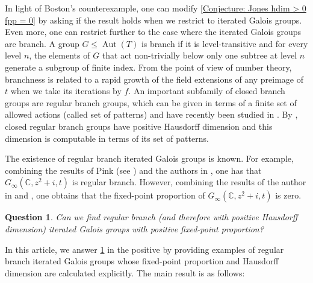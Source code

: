 \documentclass{amsart}
\def\CC{\mathbb C}
\DeclareMathOperator{\Aut}{Aut}
\newtheorem{Question}[Proposition]{Question}
\begin{document}
In light of Boston's counterexample, one can modify \cref{Conjecture: Jones hdim > 0 fpp = 0} by asking if the result holds when we restrict to iterated Galois groups. Even more, one can restrict further to the case where the iterated Galois groups are branch. A group $G \leq \Aut(T)$ is branch if it is level-transitive and for every level $n$, the elements of $G$ that act non-trivially below only one subtree at level $n$ generate a subgroup of finite index. From the point of view of number theory, branchness is related to a rapid growth of the field extensions of any preimage of $t$ when we take its iterations by $f$. An important subfamily of closed branch groups are regular branch groups, which can be given in terms of a finite set of allowed actions (called set of patterns) and have recently been studied in \cite{RadiFiniteType2025}. By \cite[Proposition 2.7]{Bartholdi2006}, closed regular branch groups have positive Hausdorff dimension and this dimension is computable in terms of its set of patterns.

The existence of regular branch iterated Galois groups is known. For example, combining the results of Pink (see \cite[Theorem 6.4.2]{Self_similar_groups}) and the authors in \cite[Theorem 2.5]{GrigSavchukSunic2007}, one has that $G_\infty(\CC, z^2+i,t)$ is regular branch. However, combining the results of the author in \cite[Section 8.3]{RadiFiniteType2025} and \cite[Theorem 1]{FariñaRadi2025}, one obtains that the fixed-point proportion of $G_\infty(\CC,z^2+i,t)$ is zero. 

\begin{Question}
Can we find regular branch (and therefore with positive Hausdorff dimension) iterated Galois groups with positive fixed-point proportion?
\label{Question: positive FPP Hausdorff dimension}
\end{Question}

In this article, we answer \cref{Question: positive FPP Hausdorff dimension} in the positive by providing examples of regular branch iterated Galois groups whose fixed-point proportion and Hausdorff dimension are calculated explicitly. The main result is as follows:
\end{document}
